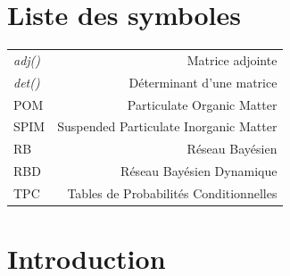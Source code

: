 \documentclass[12pt]{report}
\begin{document}
\begin{minipage}[]{1\linewidth}
\chapter*{Liste des symboles}
\begin{tabular}{ l r }
   \textit{adj()} & Matrice adjointe \\
   \textit{det()} & Déterminant d'une matrice \\
   POM & Particulate Organic Matter\\
   SPIM & Suspended Particulate Inorganic Matter \\
   RB & Réseau Bayésien \\
   RBD & Réseau Bayésien Dynamique \\
   TPC & Tables de Probabilités Conditionnelles \\
 \end{tabular}
\thispagestyle{empty}
\end{minipage}


% 


\cleardoublepage %


\chapter{Introduction}
\end{document}

